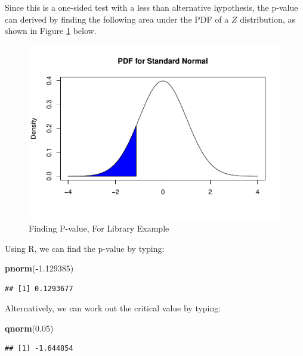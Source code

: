 \documentclass[
]{book}
\newenvironment{Shaded}{\begin{snugshade}}{\end{snugshade}}
\newcommand{\FloatTok}[1]{\textcolor[rgb]{0.00,0.00,0.81}{#1}}
\newcommand{\FunctionTok}[1]{\textcolor[rgb]{0.13,0.29,0.53}{\textbf{#1}}}
\newcommand{\NormalTok}[1]{#1}
\newcommand{\SpecialCharTok}[1]{\textcolor[rgb]{0.81,0.36,0.00}{\textbf{#1}}}
\begin{document}
Since this is a one-sided test with a less than alternative hypothesis, the p-value can derived by finding the following area under the PDF of a \(Z\) distribution, as shown in Figure \ref{fig:9-pvalworked2} below.

\begin{figure}
\centering
\includegraphics{bookdown-demo_files/figure-latex/9-pvalworked2-1.pdf}
\caption{\label{fig:9-pvalworked2}Finding P-value, For Library Example}
\end{figure}

Using R, we can find the p-value by typing:

\begin{Shaded}
\begin{Highlighting}[]
\FunctionTok{pnorm}\NormalTok{(}\SpecialCharTok{{-}}\FloatTok{1.129385}\NormalTok{)}
\end{Highlighting}
\end{Shaded}

\begin{verbatim}
## [1] 0.1293677
\end{verbatim}

Alternatively, we can work out the critical value by typing:

\begin{Shaded}
\begin{Highlighting}[]
\FunctionTok{qnorm}\NormalTok{(}\FloatTok{0.05}\NormalTok{)}
\end{Highlighting}
\end{Shaded}

\begin{verbatim}
## [1] -1.644854
\end{verbatim}
\end{document}
